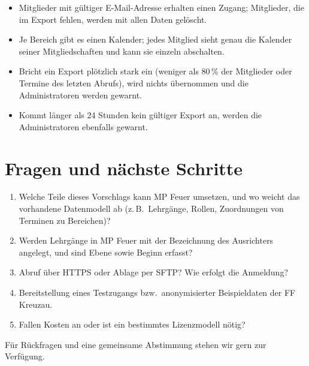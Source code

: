 \documentclass[a4paper,fontsize=10pt]{scrartcl}
\begin{document}
\begin{itemize}
  \item Mitglieder mit gültiger E-Mail-Adresse erhalten einen Zugang;
        Mitglieder, die im Export fehlen, werden mit allen Daten gelöscht.
  \item Je Bereich gibt es einen Kalender; jedes Mitglied sieht genau die
        Kalender seiner Mitgliedschaften und kann sie einzeln abschalten.
  \item Bricht ein Export plötzlich stark ein (weniger als 80\,\% der
        Mitglieder oder Termine des letzten Abrufs), wird nichts übernommen
        und die Administratoren werden gewarnt.
  \item Kommt länger als 24 Stunden kein gültiger Export an, werden die
        Administratoren ebenfalls gewarnt.
\end{itemize}

\section{Fragen und nächste Schritte}

\begin{enumerate}
  \item Welche Teile dieses Vorschlags kann MP Feuer umsetzen, und wo weicht
        das vorhandene Datenmodell ab (z.\,B.\ Lehrgänge, Rollen,
        Zuordnungen von Terminen zu Bereichen)?
  \item Werden Lehrgänge in MP Feuer mit der Bezeichnung des Ausrichters
        angelegt, und sind Ebene sowie Beginn erfasst?
  \item Abruf über HTTPS oder Ablage per SFTP? Wie erfolgt die Anmeldung?
  \item Bereitstellung eines Testzugangs bzw.\ anonymisierter Beispieldaten
        der FF Kreuzau.
  \item Fallen Kosten an oder ist ein bestimmtes Lizenzmodell nötig?
\end{enumerate}

Für Rückfragen und eine gemeinsame Abstimmung stehen wir gern zur Verfügung.
\end{document}
